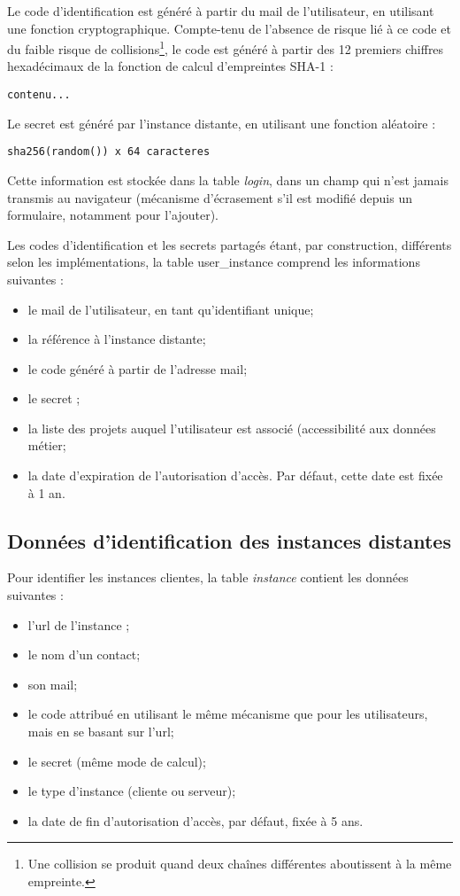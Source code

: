 Le code d'identification est généré à partir du mail de l'utilisateur, en utilisant une fonction cryptographique. Compte-tenu de l'absence de risque lié à ce code et du faible risque de collisions\footnote{Une collision se produit quand deux chaînes différentes aboutissent à la même empreinte.}, le code est généré à partir des 12 premiers chiffres hexadécimaux de la fonction de calcul d'empreintes SHA-1 :

\begin{lstlisting}
contenu...
\end{lstlisting}

Le secret est généré par l'instance distante, en utilisant une fonction aléatoire :
\begin{lstlisting}
sha256(random()) x 64 caracteres
\end{lstlisting}

Cette information est stockée dans la table \textit{login}, dans un champ qui n'est jamais transmis au navigateur (mécanisme d'écrasement s'il est modifié depuis un formulaire, notamment pour l'ajouter).

Les codes d'identification et les secrets partagés étant, par construction, différents selon les implémentations, la table user\_instance comprend les informations suivantes :
\begin{itemize}
\item le mail de l'utilisateur, en tant qu'identifiant unique;
\item la référence à l'instance distante;
\item le code généré à partir de l'adresse mail;
\item le secret ;
\item la liste des projets auquel l'utilisateur est associé (accessibilité aux données \og métier\fg{};
\item la date d'expiration de l'autorisation d'accès. Par défaut, cette date est fixée à 1 an.
\end{itemize}


\subsection{Données d'identification des instances distantes}
\label{table_instance}

Pour identifier les instances clientes, la table \textit{instance} contient les données suivantes :
\begin{itemize}
\item l'url de l'instance ;
\item le nom d'un contact;
\item son mail;
\item le code attribué en utilisant le même mécanisme que pour les utilisateurs, mais en se basant sur l'url;
\item le secret (même mode de calcul);
\item le type d'instance (cliente ou serveur);
\item la date de fin d'autorisation d'accès, par défaut, fixée à 5 ans.
\end{itemize}

